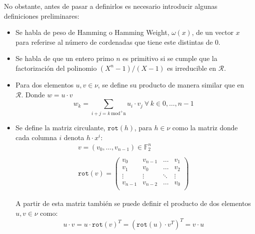 No obstante, antes de pasar a definirlos es necesario introducir algunas definiciones preliminares:
\begin{itemize}
	\item Se habla de peso de Hamming o Hamming Weight, \(\omega(x)\), de un vector \(x\) para referirse al número de cordenadas que tiene este distintas de 0. 
	\item Se habla de que un entero primo \(n\) es primitivo si se cumple que la factorización del polinomio \((X^n-1)/(X-1)\) es irreducible en \(\mathcal{R}\).
	\item Para dos elementos \(u,v\in \nu\), se define su producto de manera similar que en \(\mathcal{R}\). Donde \(w=u\cdot v\)
	\begin{equation}
		w_k=\sum_{i+j=k \ \text{mod}^{+}\text{n}} u_i\cdot v_j \ \forall \ k\in {0,\hdots, n-1}
	\end{equation}
	\item Se define la matriz circulante, \(\texttt{rot}(h)\), para \(h\in \nu\) como la matriz donde cada columna \(i\) denota \(h\cdot x^i\):
	\begin{equation}
		\begin{array}{l}
			v=(v_0,\hdots,v_{n-1}) \in \mathbb{F}_2^n\\ \\
			\texttt{rot}(v)=\begin{pmatrix}
				v_0 &v_{n-1}&\hdots & v_1\\
				v_1 &v_0&\hdots & v_2\\
				\vdots &\vdots&\ddots & \vdots\\
				v_{n-1} &v_{n-2}&\hdots & v_0\\
			\end{pmatrix}
		\end{array}
	\end{equation}
	
	A partir de esta matriz también se puede definir el producto de dos elementos \(u,v\in \nu\) como:
	\begin{equation}
		u\cdot v= u\cdot \texttt{rot}(v)^T=(\texttt{rot}(u)\cdot v^T)^T=v\cdot u
	\end{equation}
\end{itemize}

